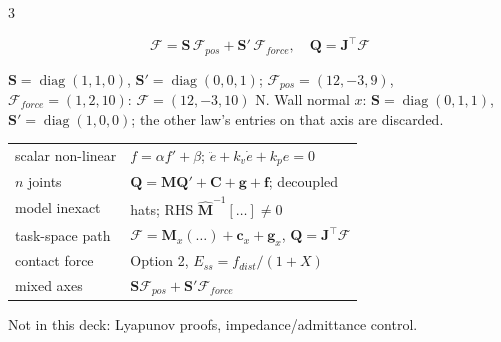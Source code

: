 \begin{multicols}{3}
\columnbreak
{}
\begin{fbx}
\[\boldsymbol{\mathcal F}=\mathbf S\,\boldsymbol{\mathcal F}_{pos}+\mathbf S'\,\boldsymbol{\mathcal F}_{force},\quad \mathbf Q=\mathbf J^\top\boldsymbol{\mathcal F}\]
\end{fbx}
\begin{worked}
$\mathbf S=\operatorname{diag}(1,1,0)$, $\mathbf S'=\operatorname{diag}(0,0,1)$; $\mathcal F_{pos}=(12,-3,9)$, $\mathcal F_{force}=(1,2,10)$: $\mathcal F=(12,-3,10)$ N. Wall normal $x$: $\mathbf S=\operatorname{diag}(0,1,1)$, $\mathbf S'=\operatorname{diag}(1,0,0)$; the other law's entries on that axis are discarded. \chk
\end{worked}

\begin{tabularx}{\linewidth}{@{}>{\raggedright}p{19mm}X@{}}\toprule
scalar non-linear & $f=\alpha f'+\beta$; $\ddot e+k_v\dot e+k_pe=0$\\
$n$ joints & $\mathbf Q=\mathbf M\mathbf Q'+\mathbf C+\mathbf g+\mathbf f$; decoupled\\
model inexact & hats; RHS $\hat{\mathbf M}^{-1}[\dots]\ne0$\\
task-space path & $\mathcal F=\mathbf M_x(\dots)+\mathbf c_x+\mathbf g_x$, $\mathbf Q=\mathbf J^\top\mathcal F$\\
contact force & Option 2, $E_{ss}=f_{dist}/(1{+}X)$\\
mixed axes & $\mathbf S\mathcal F_{pos}+\mathbf S'\mathcal F_{force}$\\\bottomrule
\end{tabularx}
Not in this deck: Lyapunov proofs, impedance/admittance control.


\end{multicols}
